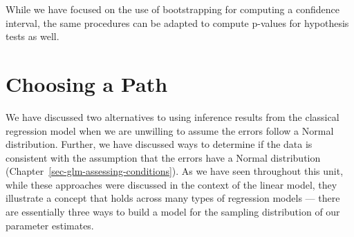 \documentclass[
  letterpaper,
  DIV=11,
  numbers=noendperiod]{scrreprt}
\theoremstyle{definition}
\theoremstyle{definition}
\theoremstyle{remark}
\begin{document}
\begin{tcolorbox}[enhanced jigsaw, bottomrule=.15mm, titlerule=0mm, bottomtitle=1mm, colback=white, coltitle=black, rightrule=.15mm, leftrule=.75mm, toprule=.15mm, toptitle=1mm, left=2mm, opacityback=0, colframe=quarto-callout-note-color-frame, breakable, title=\textcolor{quarto-callout-note-color}{\faInfo}\hspace{0.5em}{Note}, arc=.35mm, colbacktitle=quarto-callout-note-color!10!white, opacitybacktitle=0.6]

While we have focused on the use of bootstrapping for computing a
confidence interval, the same procedures can be adapted to compute
p-values for hypothesis tests as well.

\end{tcolorbox}

\hypertarget{choosing-a-path}{%
\section{Choosing a Path}\label{choosing-a-path}}

We have discussed two alternatives to using inference results from the
classical regression model when we are unwilling to assume the errors
follow a Normal distribution. Further, we have discussed ways to
determine if the data is consistent with the assumption that the errors
have a Normal distribution (Chapter~\ref{sec-glm-assessing-conditions}).
As we have seen throughout this unit, while these approaches were
discussed in the context of the linear model, they illustrate a concept
that holds across many types of regression models --- there are
essentially three ways to build a model for the sampling distribution of
our parameter estimates.
\end{document}

